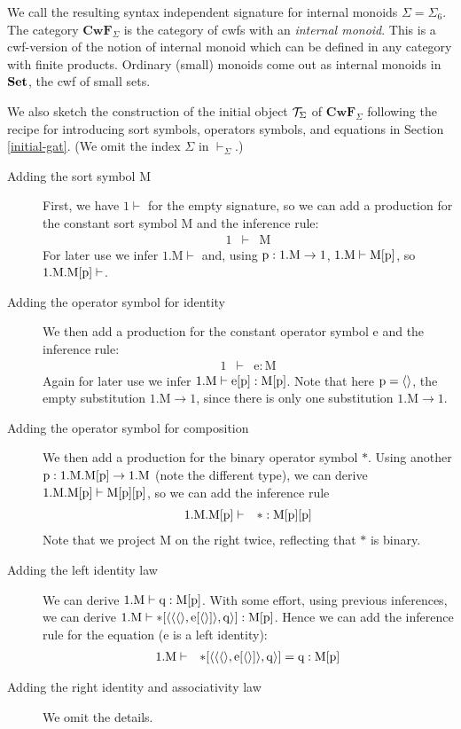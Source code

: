 \documentclass{lmcs}
\def\Cwf{\mathbf{CwF}}
\def\Mon{\mathrm{M}}
\def\idmon{\mathrm{e}}
\def\comp{\mathrm{*}}
\begin{document}
We call the resulting syntax independent signature for internal monoids $\Sigma = \Sigma_6$. The category $\Cwf_\Sigma$ is the category of cwfs with an {\em internal monoid}. This is a cwf-version of the notion of internal monoid which can be defined in any category with finite products. Ordinary (small) monoids come out as internal monoids in ${\bf Set}$, the cwf of small sets.

We also sketch the construction of the initial object ${\mathcal T}_\Sigma$ of $\Cwf_\Sigma$ following the recipe for introducing sort symbols, operators symbols, and equations in Section \ref{initial-gat}. (We omit the index $\Sigma$ in $\vdash_\Sigma$.)
\begin{description}
\item[Adding the sort symbol $\Mon$]
First, we have $1 \vdash$ for the empty signature, so we can
add a production for the constant sort symbol $\Mon$ and the inference rule:
\begin{eqnarray*}
1 &\vdash& \Mon
\end{eqnarray*}
For later use we infer $1.\Mon \vdash$ and, using $\p:1.\Mon \to 1$, $1.\Mon\vdash\Mon[\p]$,
so $1.\Mon.\Mon[\p] \vdash$.
\item[Adding the operator symbol for identity]
We then add a production for the constant operator symbol $\idmon$ and the inference rule:
\begin{eqnarray*}
1 &\vdash& \idmon : \Mon
\end{eqnarray*}
Again for later use we infer $1.\Mon\vdash \idmon[\p] :\Mon[\p]$.
Note that here $\mathrm{p} = \langle  \rangle$, the empty substitution $1.\Mon \to 1$,
since there is only one substitution $1.\Mon \to 1$.
\item[Adding the operator symbol for composition]
We then add a production for the binary operator symbol $\comp$.
Using another $\p: 1.\Mon.\Mon[\p] \to 1.\Mon$ (note the different type),
we can derive $1.\Mon.\Mon[\p] \vdash \Mon[\p][\p]$, so we can add the inference rule
\begin{eqnarray*}
1.\Mon.\Mon[\p] &\vdash& \comp : \Mon[\p][\p]
\end{eqnarray*}
Note that we project $\Mon$ on the right twice, reflecting that $\comp$ is binary.
\item[Adding the left identity law]
We can derive $1.\Mon \vdash \q : \Mon[\p]$. With some effort,
using previous inferences, we can  derive
$1.\Mon \vdash \comp[\tuple{\tuple{\tuple{},\idmon[\tuple{}]},\q}] : \Mon[\p]$.
Hence we can add the inference rule for the equation ($\idmon$ is a left identity):
\begin{eqnarray*}
1.\Mon &\vdash& \comp[\tuple{\tuple{\tuple{},\idmon[\tuple{}]},\q}] = \q : \Mon[\p]
\end{eqnarray*}
\item[Adding the right identity and associativity law]
We omit the details.
\end{description}
\end{document}
